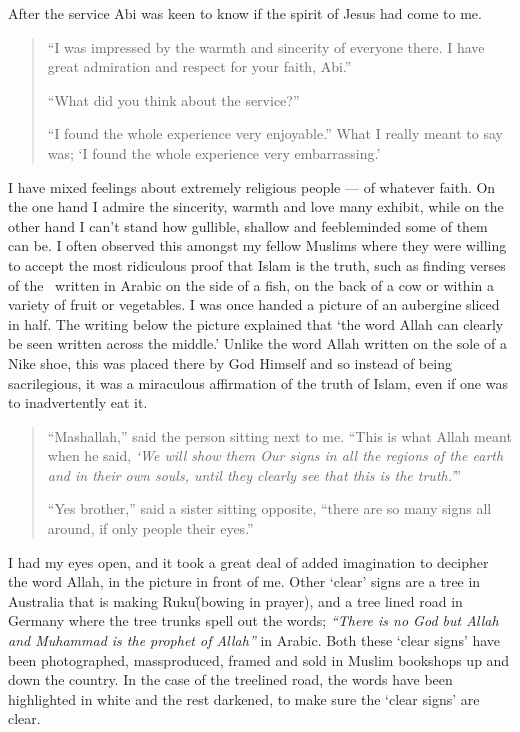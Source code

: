 \documentclass[12pt]{memoir}
\begin{document}
After the service Abi was keen to know if the spirit of Jesus had come to me.

\begin{quote}
“I was impressed by the warmth and sincerity of everyone there.
I have great admiration and respect for your faith, Abi.”

“What did you think about the service?”

“I found the whole experience very enjoyable.”
What I really meant to say was;
‘I found the whole experience very embarrassing.’
\end{quote}

I have mixed feelings about extremely religious people — of whatever faith.
On the one hand I admire the sincerity, warmth and love many exhibit,
while on the other hand I can’t stand how gullible,
shallow and feeble\–minded some of them can be.
I often observed this amongst my fellow Muslims where they were willing
to accept the most ridiculous proof that Islam is the truth,
such as finding verses of the \Quran\ written in Arabic on the side of a fish,
on the back of a cow or within a variety of fruit or vegetables.
I was once handed a picture of an aubergine sliced in half.
The writing below the picture explained that
‘the word Allah can clearly be seen written across the middle.’
Unlike the word Allah written on the sole of a Nike shoe,
this was placed there by God Himself and so instead of being sacrilegious,
it was a miraculous affirmation of the truth of Islam,
even if one was to inadvertently eat it.

\begin{quote}
“Mashallah,” said the person sitting next to me.
“This is what Allah meant when he said,
\emph{‘We will show them Our signs in all the regions of the earth
and in their own souls, until they clearly see that this is the truth.’}”

“Yes brother,” said a sister sitting opposite,
“there are so many signs all around,
if only people  their eyes.”
\end{quote}

I had my eyes open, and it took a great deal of added imagination
to decipher the word Allah, in the picture in front of me.
Other ‘clear’ signs are a tree in Australia that is making Ruku\`
(bowing in prayer), and a tree lined road in Germany
where the tree trunks spell out the words;
\emph{“There is no God but Allah and Muhammad is the prophet of Allah”}
in Arabic.
Both these ‘clear signs’ have been photographed, mass\–produced,
framed and sold in Muslim bookshops up and down the country.
In the case of the tree\–lined road, the words have been highlighted
in white and the rest darkened, to make sure the ‘clear signs’ are clear.
\end{document}
